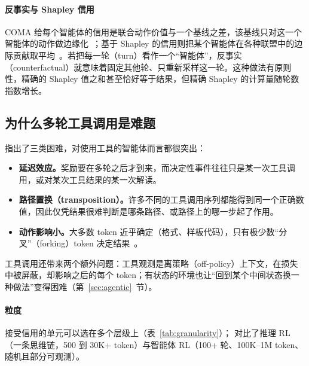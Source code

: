 \paragraph{反事实与 Shapley 信用}
COMA 给每个智能体的信用是联合动作价值与一个基线之差，该基线只对这一个智能体的动作做边缘化~\citep{foerster2018counterfactual}；基于 Shapley 的信用则把某个智能体在各种联盟中的边际贡献取平均~\citep{wang2020shapley}。若把每一轮（turn）看作一个“智能体”，反事实（counterfactual）就意味着固定其他轮、只重新采样这一轮。这种做法有原则性，精确的 Shapley 值之和甚至恰好等于结果，但精确 Shapley 的计算量随轮数指数增长。

\subsection{为什么多轮工具调用是难题}

\citet{pignatelli2024survey} 指出了三类困难，对使用工具的智能体而言都很突出：
\begin{itemize}
  \item \textbf{延迟效应。}奖励要在多轮之后才到来，而决定性事件往往只是某一次工具调用，或对某次工具结果的某一次解读。
  \item \textbf{路径置换（transposition）。}许多不同的工具调用序列都能得到同一个正确数值，因此仅凭结果很难判断是哪条路径、或路径上的哪一步起了作用。
  \item \textbf{动作影响小。}大多数 token 近乎确定（格式、样板代码），只有极少数“分叉”（forking）token 决定结果~\citep{wang2025beyond}。
\end{itemize}
工具调用还带来两个额外问题：工具观测是离策略（off-policy）上下文，在损失中被屏蔽，却影响之后的每个 token；有状态的环境也让“回到某个中间状态换一种做法”变得困难（第~\ref{sec:agentic}~节）。

\paragraph{粒度}
接受信用的单元可以选在多个层级上（表~\ref{tab:granularity}）；\citet{zhang2026from} 对比了推理 RL（一条思维链，500 到 30K+ token）与智能体 RL（100+ 轮、100K--1M token、随机且部分可观测）。

